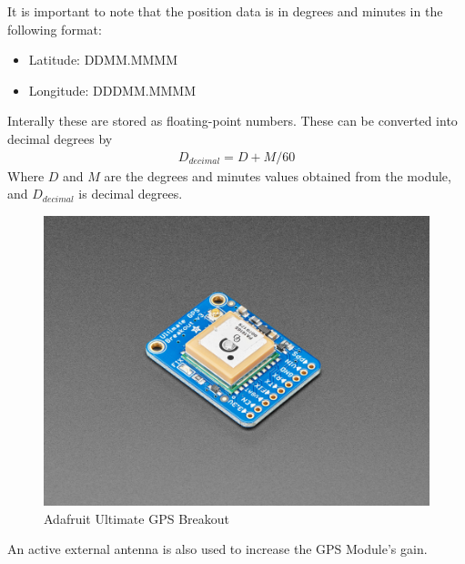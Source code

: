 It is important to note that the position data is in degrees and minutes in the following format:
\begin{itemize}
    \item Latitude: DDMM.MMMM
    \item Longitude: DDDMM.MMMM
\end{itemize}
Interally these are stored as floating-point numbers.
These can be converted into decimal degrees by
\begin{gather}
    D_{decimal} = D+M/60
\end{gather}
Where $D$ and $M$ are the degrees and minutes values obtained from the module, and $D_{decimal}$ is decimal degrees.
\begin{figure}[H]
\centering
    \includegraphics{images/gps.jpg}
    \caption{Adafruit Ultimate GPS Breakout}
    \label{fig:gps}
\end{figure}
An active external antenna is also used to increase the GPS Module's gain.

